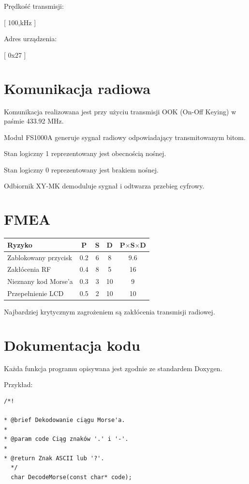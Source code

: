 \documentclass[a4paper,12pt]{article}
\begin{document}
Prędkość transmisji:

[
100,kHz
]

Adres urządzenia:

[
0x27
]

\section{Komunikacja radiowa}

Komunikacja realizowana jest przy użyciu transmisji OOK (On-Off Keying) w paśmie 433.92 MHz.

Moduł FS1000A generuje sygnał radiowy odpowiadający transmitowanym bitom.

Stan logiczny 1 reprezentowany jest obecnością nośnej.

Stan logiczny 0 reprezentowany jest brakiem nośnej.

Odbiornik XY-MK demoduluje sygnał i odtwarza przebieg cyfrowy.

\section{FMEA}

\begin{table}[h]
\centering
\begin{tabular}{|p{4cm}|c|c|c|c|}
\hline
Ryzyko & P & S & D & P$\times$S$\times$D \\
\hline
Zablokowany przycisk & 0.2 & 6 & 8 & 9.6 \\
\hline
Zakłócenia RF & 0.4 & 8 & 5 & 16 \\
\hline
Nieznany kod Morse'a & 0.3 & 3 & 10 & 9 \\
\hline
Przepełnienie LCD & 0.5 & 2 & 10 & 10 \\
\hline
\end{tabular}
\end{table}

Najbardziej krytycznym zagrożeniem są zakłócenia transmisji radiowej.

\section{Dokumentacja kodu}

Każda funkcja programu opisywana jest zgodnie ze standardem Doxygen.

Przykład:

\begin{verbatim}
/*!

* @brief Dekodowanie ciągu Morse'a.
*
* @param code Ciąg znaków '.' i '-'.
*
* @return Znak ASCII lub '?'.
  */
  char DecodeMorse(const char* code);
  \end{verbatim}
\end{document}
